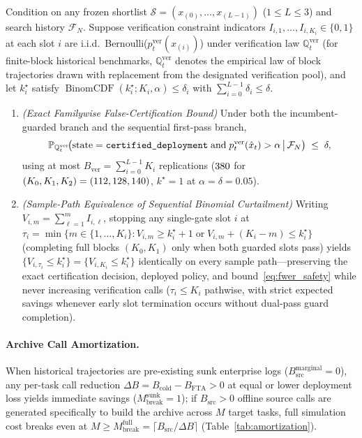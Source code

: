 \begin{theorem}\label{thm:vkg_safety}
Condition on any frozen shortlist $\mathcal{S} = (x_{(0)}, \dots, x_{(L-1)})$ ($1 \le L \le 3$) and search history $\mathcal{F}_N$. Suppose verification constraint indicators $I_{i,1},\dots,I_{i,K_i} \in \{0,1\}$ at each slot $i$ are i.i.d.\ Bernoulli($p_t^{\mathrm{ver}}(x_{(i)})$) under verification law $\mathbb{Q}_t^{\mathrm{ver}}$ (for finite-block historical benchmarks, $\mathbb{Q}_t^{\mathrm{ver}}$ denotes the empirical law of block trajectories drawn with replacement from the designated verification pool), and let $k_i^\star$ satisfy $\operatorname{BinomCDF}(k_i^\star; K_i, \alpha) \le \delta_i$ with $\sum_{i=0}^{L-1} \delta_i \le \delta$.
\begin{enumerate}
  \item \emph{(Exact Familywise False-Certification Bound)} Under both the incumbent-guarded branch and the sequential first-pass branch,
  \begin{equation}\label{eq:fwer_safety}
    \mathbb{P}_{\mathbb{Q}_t^{\mathrm{ver}}}\!\big(\mathrm{state} = \texttt{certified\_deployment} \;\text{and}\; p_t^{\mathrm{ver}}(\hat{x}_t) > \alpha \,\big|\, \mathcal{F}_N\big) \;\le\; \delta,
  \end{equation}
  using at most $B_{\mathrm{ver}} = \sum_{i=0}^{L-1} K_i$ replications ($380$ for $(K_0,K_1,K_2) = (112, 128, 140)$, $k^\star = 1$ at $\alpha = \delta = 0.05$).
  \item \emph{(Sample-Path Equivalence of Sequential Binomial Curtailment)} Writing $V_{i,m} = \sum_{\ell=1}^m I_{i,\ell}$, stopping any single-gate slot $i$ at $\tau_i = \min\big\{m \in \{1,\dots,K_i\} : V_{i,m} \ge k_i^\star + 1 \;\text{or}\; V_{i,m} + (K_i - m) \le k_i^\star\big\}$ (completing full blocks $(K_0, K_1)$ only when both guarded slots pass) yields $\{V_{i,\tau_i} \le k_i^\star\} = \{V_{i,K_i} \le k_i^\star\}$ identically on every sample path—preserving the exact certification decision, deployed policy, and bound~\eqref{eq:fwer_safety} while never increasing verification calls ($\tau_i \le K_i$ pathwise, with strict expected savings whenever early slot termination occurs without dual-pass guard completion).
\end{enumerate}
\end{theorem}

\paragraph{Archive Call Amortization.}
When historical trajectories are pre-existing sunk enterprise logs ($B_{\mathrm{src}}^{\mathrm{marginal}} = 0$), any per-task call reduction $\Delta B = B_{\mathrm{cold}} - B_{\mathrm{FTA}} > 0$ at equal or lower deployment loss yields immediate savings ($M_{\mathrm{break}}^{\mathrm{sunk}} = 1$); if $B_{\mathrm{src}} > 0$ offline source calls are generated specifically to build the archive across $M$ target tasks, full simulation cost breaks even at $M \ge M_{\mathrm{break}}^{\mathrm{full}} = \lceil B_{\mathrm{src}} / \Delta B \rceil$ (Table~\ref*{tab:amortization}).
